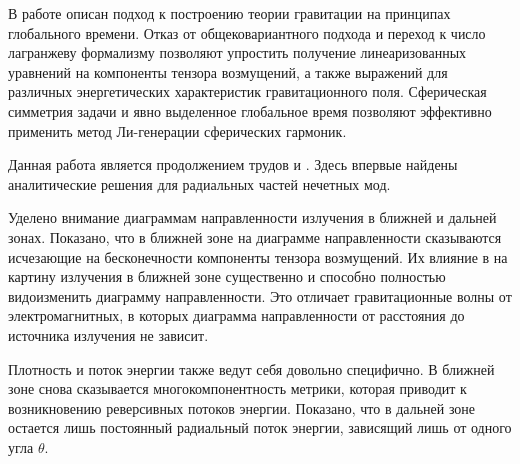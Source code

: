 \documentclass[\docroot/reports/draft/report.tex]{subfiles}
\begin{document}
\onlyinsubfile{\tableofcontents}

В работе описан подход к построению теории гравитации на принципах глобального времени. Отказ от общековариантного подхода и переход к число лагранжеву формализму позволяют упростить получение линеаризованных уравнений на компоненты тензора возмущений, а также выражений для различных энергетических характеристик гравитационного поля. Сферическая симметрия задачи и явно выделенное глобальное время позволяют эффективно применить метод Ли-генерации сферических гармоник.

Данная работа является продолжением трудов \cite{burlankov_space_dynamics} и \cite{burlankov_grav_waves}. Здесь впервые найдены аналитические решения для радиальных частей нечетных мод.

Уделено внимание диаграммам направленности излучения в ближней и дальней зонах. Показано, что в ближней зоне на диаграмме направленности сказываются исчезающие на бесконечности компоненты тензора возмущений. Их влияние в на картину излучения в ближней зоне существенно и способно полностью видоизменить диаграмму направленности. Это отличает гравитационные волны от электромагнитных, в которых диаграмма направленности от расстояния до источника излучения не зависит.

Плотность и поток энергии также ведут себя довольно специфично. В ближней зоне снова сказывается многокомпонентность метрики, которая приводит к возникновению реверсивных потоков энергии. Показано, что в дальней зоне остается лишь постоянный радиальный поток энергии, зависящий лишь от одного угла $\theta$.

\end{document}
